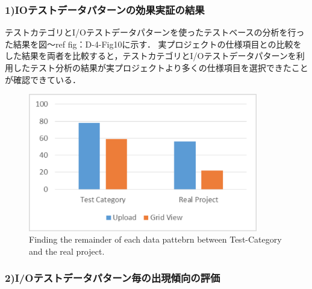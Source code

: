 \documentclass[a4paper,10pt]{jreport}
\begin{document}
\subsubsection{1)IOテストデータパターンの効果実証の結果}
テストカテゴリとI/Oテストデータパターンを使ったテストベースの分析を行った結果を図〜ref {fig：D-4-Fig10}に示す．
実プロジェクトの仕様項目との比較をした結果を両者を比較すると，テストカテゴリとI/Oテストデータパターンを利用したテスト分析の結果が実プロジェクトより多くの仕様項目を選択できたことが確認できている．
   \begin{figure}[htbp]
  \begin{center}
  \includegraphics[width=10cm]{./image/D-4-Fig10.png}
  \caption{Finding the remainder of each data pattebrn between Test-Category and the real project.}
  \label{fig:D-4-Fig10}
  \end{center}
   \end{figure}

\subsubsection{2)I/Oテストデータパターン毎の出現傾向の評価}
\end{document}
